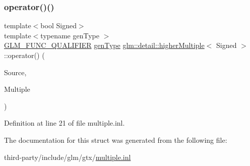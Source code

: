 \subsubsection{\texorpdfstring{operator()()}{operator()()}}
{\footnotesize\ttfamily template$<$bool Signed$>$ \\
template$<$typename gen\+Type $>$ \\
\hyperlink{setup_8hpp_a33fdea6f91c5f834105f7415e2a64407}{G\+L\+M\+\_\+\+F\+U\+N\+C\+\_\+\+Q\+U\+A\+L\+I\+F\+I\+ER} \hyperlink{structglm_1_1detail_1_1gen_type}{gen\+Type} \hyperlink{structglm_1_1detail_1_1higher_multiple}{glm\+::detail\+::higher\+Multiple}$<$ Signed $>$\+::operator() (\begin{DoxyParamCaption}\item[{\hyperlink{structglm_1_1detail_1_1gen_type}{gen\+Type} const \&}]{Source,  }\item[{\hyperlink{structglm_1_1detail_1_1gen_type}{gen\+Type} const \&}]{Multiple }\end{DoxyParamCaption})\hspace{0.3cm}{\ttfamily [inline]}}



Definition at line 21 of file multiple.\+inl.



The documentation for this struct was generated from the following file\+:\begin{DoxyCompactItemize}
\item 
third-\/party/include/glm/gtx/\hyperlink{multiple_8inl}{multiple.\+inl}\end{DoxyCompactItemize}
